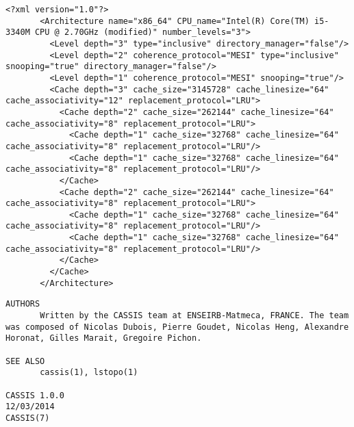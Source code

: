 \begin{lstlisting}[style=styleXml]
       <?xml version="1.0"?>
       <Architecture name="x86_64" CPU_name="Intel(R) Core(TM) i5-3340M CPU @ 2.70GHz (modified)" number_levels="3">
         <Level depth="3" type="inclusive" directory_manager="false"/>
         <Level depth="2" coherence_protocol="MESI" type="inclusive" snooping="true" directory_manager="false"/>
         <Level depth="1" coherence_protocol="MESI" snooping="true"/>
         <Cache depth="3" cache_size="3145728" cache_linesize="64" cache_associativity="12" replacement_protocol="LRU">
           <Cache depth="2" cache_size="262144" cache_linesize="64" cache_associativity="8" replacement_protocol="LRU">
             <Cache depth="1" cache_size="32768" cache_linesize="64" cache_associativity="8" replacement_protocol="LRU"/>
             <Cache depth="1" cache_size="32768" cache_linesize="64" cache_associativity="8" replacement_protocol="LRU"/>
           </Cache>
           <Cache depth="2" cache_size="262144" cache_linesize="64" cache_associativity="8" replacement_protocol="LRU">
             <Cache depth="1" cache_size="32768" cache_linesize="64" cache_associativity="8" replacement_protocol="LRU"/>
             <Cache depth="1" cache_size="32768" cache_linesize="64" cache_associativity="8" replacement_protocol="LRU"/>
           </Cache>
         </Cache>
       </Architecture>
\end{lstlisting}
\begin{lstlisting}[style=styleMan]
AUTHORS
       Written by the CASSIS team at ENSEIRB-Matmeca, FRANCE. The team was composed of Nicolas Dubois, Pierre Goudet, Nicolas Heng, Alexandre Horonat, Gilles Marait, Gregoire Pichon.

SEE ALSO
       cassis(1), lstopo(1)

CASSIS 1.0.0                                                                                                  12/03/2014                                                                                                     CASSIS(7)
\end{lstlisting}

